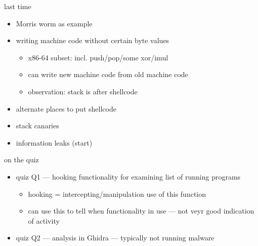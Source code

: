 \date{}
\title{}
\date{}

\begin{frame}
    \titlepage
\end{frame}





\begin{frame}{last time}
    \begin{itemize}
    \item Morris worm as example
    \item writing machine code without certain byte values
        \begin{itemize}
        \item x86-64 subset: incl. push/pop/some xor/imul
        \item can write new machine code from old machine code
        \item observation: stack is after shellcode
        \end{itemize}
    \item alternate places to put shellcode
    \item stack canaries
    \item information leaks (start)
    \end{itemize}
\end{frame}

\begin{frame}{on the quiz}
    \begin{itemize}
    \item quiz Q1 --- hooking functionality for examining list of running programs
        \begin{itemize}
        \item hooking = intercepting/manipulation use of this function
        \item can use this to tell when functionality in use --- not veyr good indication of activity
        \end{itemize}
    \item quiz Q2 --- analysis in Ghidra --- typically not running malware

    \end{itemize}
\end{frame}

